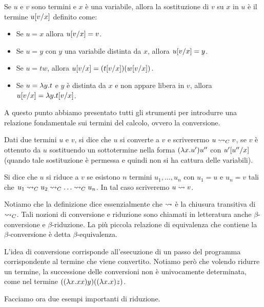 \documentclass[]{marticle}
\begin{document}
\begin{block}[Definizione]
    Se $u$ e $v$ sono termini e $x$ \`e una variabile, allora
    la sostituzione di $v$ su $x$ in $u$ \`e il termine $u [v/x]$ definito
    come:
    \begin{itemize}
        \item Se $u=x$ allora $u [v/x] = v$.
        \item Se $u=y$ con $y$ una variabile distinta da $x$, allora $u
            [v/x] = y$.
        \item Se $u = tw$, allora $u [v/x] = (t [v/x])(w [v/x])
            $.
        \item Se $u = \lambda y. t$ e $y$ \`e distinta da $x$ e non appare libera in
            $v$, allora $u [v/x] = \lambda y. t[v/x]$.
    \end{itemize}
\end{block}

A questo punto abbiamo presentato tutti gli strumenti per introdurre una
relazione fondamentale sui termini del calcolo, ovvero la conversione.

\begin{block}[Definizione]
    Dati due termini $u$ e $v$, si dice che $u$ si converte a $v$ e scriverermo
    $u \rightsquigarrow_C v$, se $v$ \`e ottenuto da $u$ sostituendo un sottotermine nella
    forma $(\lambda x. u')u''$ con $u'[u''/x]$ (quando tale sostituzione \`e
    permessa e quindi non si ha cattura delle variabili).

    Si dice che $u$ si riduce a $v$ se esistono $n$ termini $u_1, \dots, u_n$
    con $u_1 = u$ e $u_n = v$ tali che $u_1 \conv_C u_2 \conv_C \dots \conv_C
    u_n$. In tal caso scriveremo $u\rightsquigarrow v$.
\end{block}

Notiamo che la definizione dice essenzialmente che $\rightsquigarrow$ \`e la chiusura
transitiva di $\rightsquigarrow_C$. Tali nozioni di conversione e riduzione sono chiamati
in letteratura anche $\beta$-conversione e $\beta$-riduzione. La pi\`u piccola
relazione di equivalenza che contiene la $\beta$-conversione \`e detta
$\beta$-equivalenza.

L'idea di conversione corrisponde all'esecuzione di un passo del programma
corrispondente al termine che viene convertito. Notiamo per\`o che volendo
ridurre un termine, la successione delle conversioni non \`e univocamente
determinata, come nel termine $((\lambda x .xx)y)((\lambda x.x)z)$.

Facciamo ora due esempi importanti di riduzione.
\end{document}
